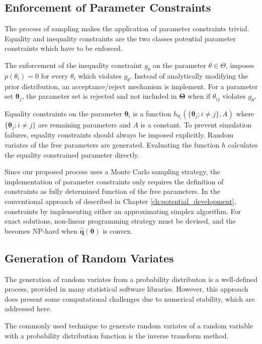 \subsection{Enforcement of Parameter Constraints}

The process of sampling makes the application of parameter constraints trivial.  Equality and inequality constraints are the two classes potential parameter constraints which have to be enforced.

The enforcement of the inequality constraint $g_{\theta}$ on the parameter $\theta \in \Theta$, imposes $p(\theta_i)=0$ for every $\theta_i$ which violates $g_{\theta}$.  Instead of analytically modifying the prior distribution, an acceptance/reject mechanism is implement.  For a parameter set $\bm{\theta}_j$, the parameter set is rejected and not included in $\bm{\Theta}$ when if $\theta_{ij}$ violates $g_{\theta}$,

Equality constraints on the parameter $\bm{\theta}_i$ is a function $h_{\theta_i} (\{\bm{\theta}_j; i \neq j\},A)$ where $\{\bm{\theta}_j; i \neq j\}$ are remaining parameters and $A$ is a constant.  To prevent simulation failures, equality constraints should always be imposed explicitly.  Random variates of the free parameters are generated.  Evaluating the function $h$ calculates the equality constrained parameter directly.

Since our proposed process uses a Monte Carlo sampling strategy, the implementation of parameter constraints only requires the definition of constraints as fully determined function of the free parameters.  In the conventional approach of described in Chapter \ref{ch:potential_development}, constraints by implementing either an approximating simplex algorithm.  For exact solutions, non-linear programming strategy must be devised, and the becomes NP-hard when $\hat{\bm{q}}(\bm{\theta})$ is convex\cite{bertsekas1995_nlp}.

\subsection{Generation of Random Variates}
\label{sec:generating_random_variates}

The generation of random variates from a probability distributon is a well-defined process, provided in many statistical software libraries.  However, this approach does present some computational challenges due to numerical stability, which are addressed here.

The commonly used technique to generate random variates of a random variable with a probability distribution function is the inverse transform method.

